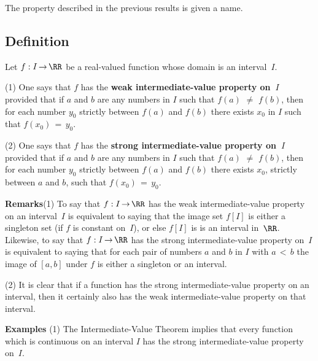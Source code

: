 \VV

        The property described in the previous results is given a name.

\V

            \subsection{\small{\bf Definition}}
            \label{DefD25.50A}

\V

        Let $f:I \,{\rightarrow}\, {\RR}$ be a real-valued function whose domain is an interval~$I$.

\V

        (1) One says that $f$ has the {\bf weak intermediate-value property on~$I$}
    provided that if $a$ and $b$ are any numbers in $I$ such that $f(a) \,\,{\neq}\,\, f(b)$,
    then for each number $y_{0}$ strictly between $f(a)$ and $f(b)$ there exists $x_{0}$ in $I$ such that $f(x_{0}) \,=\, y_{0}$.

\V

        (2) One says that $f$ has the {\bf strong intermediate-value property on~$I$}
    provided that if $a$ and $b$ are any numbers in $I$ such that $f(a) \,\,{\neq}\,\, f(b)$,
    then for each number $y_{0}$ strictly between $f(a)$ and $f(b)$ there exists $x_{0}$, strictly between $a$ and $b$, such that $f(x_{0}) \,=\, y_{0}$.

\VV

        {\bf Remarks}(1) To say that $f:I \,{\rightarrow}\, {\RR}$ has the weak intermediate-value property on an interval~$I$
    is equivalent to saying that the image set $f[I]$ is either a singleton set (if $f$ is constant on~$I$), or else $f[I]$ is is an interval in~${\RR}$.
    Likewise, to say that $f:I \,{\rightarrow}\, {\RR}$ has the strong intermediate-value property on~$I$
    is equivalent to saying that for each pair of numbers $a$ and $b$ in $I$ with $a\,<\,b$
    the image of $[a,b]$ under $f$ is either a singleton or an interval.

\V

        (2) It is clear that if a function has the strong intermediate-value property on an interval,
    then it certainly also has the weak intermediate-value property on that interval.

\VV

        {\bf Examples} (1) The Intermediate-Value Theorem implies that every function
    which is continuous on an interval $I$ has the strong intermediate-value property on~$I$.

